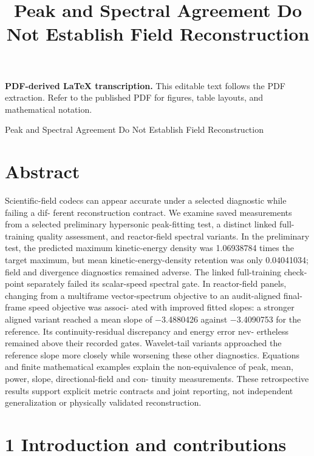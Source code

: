 \documentclass[11pt]{article}
\title{Peak and Spectral Agreement Do Not Establish Field Reconstruction}
\author{}
\date{}
\begin{document}
\maketitle
\noindent\textbf{PDF-derived LaTeX transcription.} This editable text follows the PDF extraction. Refer to the published PDF for figures, table layouts, and mathematical notation.


Peak and Spectral Agreement Do Not Establish Field
Reconstruction

\section*{Abstract}

Scientific-field codecs can appear accurate under a selected diagnostic while failing a dif-
ferent reconstruction contract. We examine saved measurements from a selected preliminary
hypersonic peak-fitting test, a distinct linked full-training quality assessment, and reactor-field
spectral variants. In the preliminary test, the predicted maximum kinetic-energy density was
1.06938784 times the target maximum, but mean kinetic-energy-density retention was only
0.04041034; field and divergence diagnostics remained adverse. The linked full-training check-
point separately failed its scalar-speed spectral gate. In reactor-field panels, changing from a
multiframe vector-spectrum objective to an audit-aligned final-frame speed objective was associ-
ated with improved fitted slopes: a stronger aligned variant reached a mean slope of \ensuremath{-}3.4880426
against \ensuremath{-}3.4090753 for the reference. Its continuity-residual discrepancy and energy error nev-
ertheless remained above their recorded gates. Wavelet-tail variants approached the reference
slope more closely while worsening these other diagnostics. Equations and finite mathematical
examples explain the non-equivalence of peak, mean, power, slope, directional-field and con-
tinuity measurements. These retrospective results support explicit metric contracts and joint
reporting, not independent generalization or physically validated reconstruction.

\section*{1 Introduction and contributions}
\end{document}
